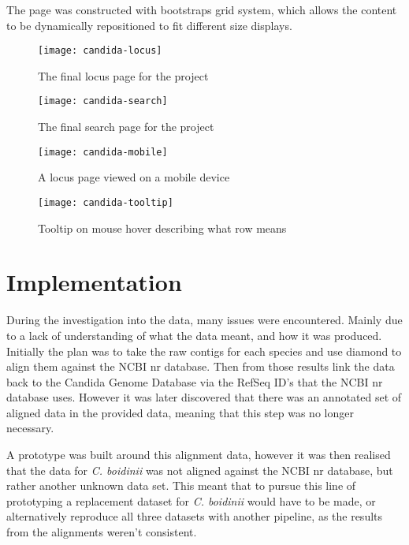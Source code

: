 The page was constructed with bootstraps\cite{bootstrap} grid system, which allows the content to be dynamically repositioned to fit different size displays.

\begin{figure}[H]
\begin{center}
\texttt{[image: candida-locus]}
\caption{The final locus page for the project}
\end{center}
\end{figure}

\begin{figure}[H]
\begin{center}
\texttt{[image: candida-search]}
\caption{The final search page for the project}
\end{center}
\end{figure}

\begin{figure}[H]
\begin{center}
\texttt{[image: candida-mobile]}
\caption{A locus page viewed on a mobile device}
\end{center}
\end{figure}

\begin{figure}[H]
\begin{center}
\texttt{[image: candida-tooltip]}
\caption{Tooltip on mouse hover describing what row means}
\end{center}
\end{figure}

\section{Implementation}
During the investigation into the data, many issues were encountered. Mainly due to a lack of understanding of what the data meant, and how it was produced. Initially the plan was to take the raw contigs for each species and use diamond to align them against the NCBI nr database. Then from those results link the data back to the Candida Genome Database via the RefSeq ID's that the NCBI nr database uses. However it was later discovered that there was an annotated set of aligned data in the provided data, meaning that this step was no longer necessary.

A prototype was built around this alignment data, however it was then realised that the data for \textit{C. boidinii} was not aligned against the NCBI nr database, but rather another unknown data set. This meant that to pursue this line of prototyping a replacement dataset for \textit{C. boidinii} would have to be made, or alternatively reproduce all three datasets with another pipeline, as the results from the alignments weren't consistent. 

